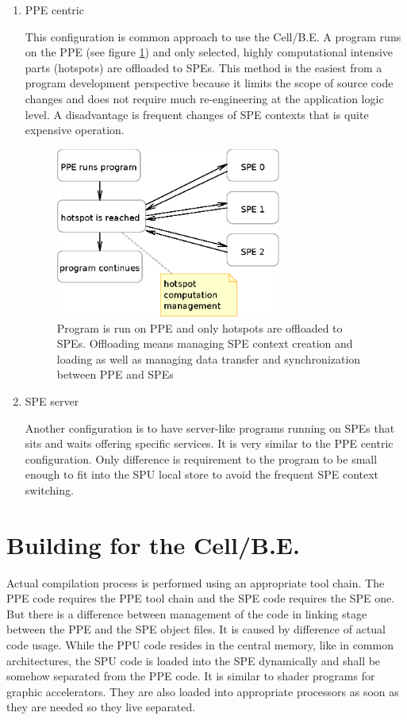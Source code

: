 \begin{enumerate}
\item PPE centric
\par
This configuration is common approach to use the \mbox{Cell/B.E.}
A program runs on the PPE (see figure \ref{fg:PPUCentricModel}) and only selected, highly computational intensive parts (hotspots) are offloaded to SPEs.
This method is the easiest from a program development perspective because it limits the scope of source code changes and does not require much re-engineering at the application logic level.
A disadvantage is frequent changes of SPE contexts that is quite expensive operation.

\begin{figure}
    \centering
    \includegraphics[width=0.7\textwidth]{data/PPUCentricModel}
    \caption[PPE centric configuration]{Program is run on PPE and only hotspots are offloaded to SPEs.
 Offloading means managing SPE context creation and loading as well as managing data transfer and synchronization between PPE and SPEs}
    \label{fg:PPUCentricModel}
\end{figure}

\item SPE server
\par
Another configuration is to have server-like programs running on SPEs that sits and waits offering specific services.
It is very similar to the PPE centric configuration.
Only difference is requirement to the program to be small enough to fit into the SPU local store to avoid the frequent SPE context switching.

\end{enumerate}

\section {Building for the \mbox{Cell/B.E.}}
\par
Actual compilation process is performed using an appropriate tool chain.
The PPE code requires the PPE tool chain and the SPE code requires the SPE one.
But there is a difference between management of the code in linking stage between the PPE and the SPE object files.
It is caused by difference of actual code usage.
While the PPU code resides in the central memory, like in common architectures, the SPU code is loaded into the SPE dynamically and shall be somehow separated from the PPE code.
It is similar to shader programs for graphic accelerators.
They are also loaded into appropriate processors as soon as they are needed so they live separated.


